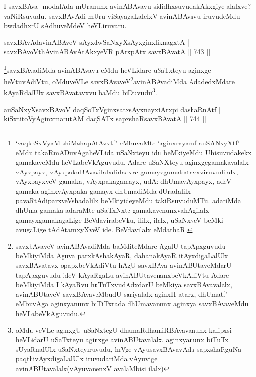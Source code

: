 \begin{artha}
I savxBAva- modalAda mUranunx avinABAvavu sididhxsuvudakAkxgiye alalxve? vaNiRsuvudu. savxBAvAdi mUru viSayagaLalelxV avinABAvavu iruvudeMdu bwdadhxrU sAdhuveMdeV heVLiruvaru.
\end{artha}


\begin{shl}
savxBAvAdavinABAveV sAyxdwSaNxyXsAyxginxliknagxtA | \\
savxBAvoV\s thAvinABAvAtAkxyeVR pArxpAtx savxBAvatA \hfill||  743 ||  
\end{shl}

\begin{artha}
\footnote{`vaqkoSxV\s yaM shiMshapAtAvxtf' eMbuvaMte `aginxrayamf auSANxyXtf' eMdu takaRmADuvAgaheVLida uSaNxteyu idu beMkiyeMdu Uhisuvudakekx gamakaveMdu heVLabeVkAguvudu, Adare uSaNXteyu aginxge\-gamakavalalx vAyxpayx, vAyxpakaBAvavilalxdidadxre gamayxgamakatavxviruvudilalx, vAyxpayxveV gamaka, vAyxpakagamayx, udA:-dhUmavAyxpayx, adeV gamaka aginxvAyxpaka gamayx dhUmadiMda dUradalilx pavaRtAdiparxveVshadalilx beMkiyideyeMdu takiRsuvuduMTu. adariMda dhUma gamaka adaraMte uSaTxNxte gamakavenunxvahAgilalx gamayxgamakagaLige BeVdavirabeVku, ililx, ilalx, uSaNxveV beMki avugaLige tAdAtamxyXveV ide. BeVdavilalx eMdathaR.}savxBAvadiMda avinABAvavu eMdu heVLidare uSaTxteyu aginxge heVtuvAdiVtu, oMduveVLe savxBAvaveV\footnote{savxbAvaveV avinABAvadiMda baMditeMdare AgalU tapApxguvudu beMkiyiMda Aguva parxkAshakAyaR, dahanakAyaR itAyxdigaLalUlx savxBAvatavx opapxbeVkAdiVtu hAgU savxBAva avinABUtaveMdarU tapApxguvudu ideV kAyaRgaLu avinABUtavenanxbeVkAdiVtu Adare beMkiyiMda I kAyaRvu huTuTxvudAdxdarU beMkiya savxBAvavalalx, avinABUtaveV savxBAvaveMbudU sariyalalx aginxH atarx, dhUmatf' eMbuvAga aginxyanunx biTiTxrada dhUmavanunx aginxya savxBAvaveMdu heVLabeVkAguvudu.}avinABAvadiMda AdadedxMdare kAyaRdalUlx savxBAvatavxvu baMdu biDuvudu\footnote{oMdu veVLe aginxgU uSaNxtegU dhamaRdhamiRBAvavanunx kalipxsi heVLidarU uSaTxteyu aginxge avinABUtavalalx. aginxyanunx biTuTx sUyaRnalUlx uSaNxteyiruvudu, hiVge vAyusavxBAvavAda sapxshaRguNa paqthivAyxdigaLalUlx iruvudariMda vAyuvige avinABUtavalalx(vAyuvanenxV avalaMbisi ilalx)}.
\end{artha}


\begin{shl}
auSaNxyXsavxBAvoV daqSoTxV\s ginxsatxsAyxnayxtArx\s pi dashaRnAtf | \\
kiSxtitoVyAginxmarutAM daqSATx sapxshaRsavxBAvatA \hfill||  744 ||  
\end{shl}

